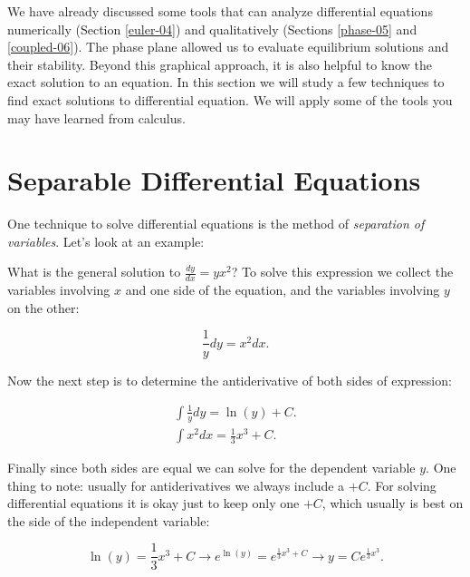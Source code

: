 \documentclass[
]{book}
\theoremstyle{definition}
\theoremstyle{definition}
\theoremstyle{definition}
\theoremstyle{remark}
\begin{document}
We have already discussed some tools that can analyze differential equations numerically (Section \ref{euler-04}) and qualitatively (Sections \ref{phase-05} and \ref{coupled-06}). The phase plane allowed us to evaluate equilibrium solutions and their stability. Beyond this graphical approach, it is also helpful to know the exact solution to an equation. In this section we will study a few techniques to find exact solutions to differential equation. We will apply some of the tools you may have learned from calculus.

\hypertarget{separable-differential-equations}{%
\section{Separable Differential Equations}\label{separable-differential-equations}}

One technique to solve differential equations is the method of \emph{separation of variables}. Let's look at an example:

What is the general solution to \(\displaystyle \frac{dy}{dx} = yx^{2}\)? To solve this expression we collect the variables involving \(x\) and one side of the equation, and the variables involving \(y\) on the other:

\begin{equation*}
\frac{1}{y} dy = x^{2} dx.
\end{equation*}

Now the next step is to determine the antiderivative of both sides of expression:

\begin{equation*}
\begin{split}
\int  \frac{1}{y} dy = \ln(y) + C. \\
\int x^{2} dx  = \frac{1}{3} x^{3} + C.
\end{split}
\end{equation*}

Finally since both sides are equal we can solve for the dependent variable \(y\). One thing to note: usually for antiderivatives we always include a \(+C\). For solving differential equations it is okay just to keep only one \(+C\), which usually is best on the side of the independent variable:

\begin{equation*}
\ln(y) =\frac{1}{3} x^{3} + C \rightarrow e^{\ln(y)} = e^{\frac{1}{3} x^{3} + C} \rightarrow y = Ce^{\frac{1}{3} x^{3}}.
\end{equation*}
\end{document}
